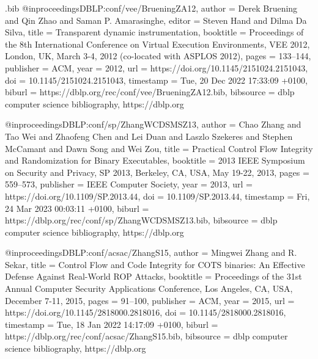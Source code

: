 \begin{filecontents}{\jobname.bib}
@inproceedings{DBLP:conf/vee/BrueningZA12,
  author       = {Derek Bruening and
                  Qin Zhao and
                  Saman P. Amarasinghe},
  editor       = {Steven Hand and
                  Dilma Da Silva},
  title        = {Transparent dynamic instrumentation},
  booktitle    = {Proceedings of the 8th International Conference on Virtual Execution
                  Environments, {VEE} 2012, London, UK, March 3-4, 2012 (co-located
                  with {ASPLOS} 2012)},
  pages        = {133--144},
  publisher    = {{ACM}},
  year         = {2012},
  url          = {https://doi.org/10.1145/2151024.2151043},
  doi          = {10.1145/2151024.2151043},
  timestamp    = {Tue, 20 Dec 2022 17:33:09 +0100},
  biburl       = {https://dblp.org/rec/conf/vee/BrueningZA12.bib},
  bibsource    = {dblp computer science bibliography, https://dblp.org}
}

@inproceedings{DBLP:conf/sp/ZhangWCDSMSZ13,
  author       = {Chao Zhang and
                  Tao Wei and
                  Zhaofeng Chen and
                  Lei Duan and
                  Laszlo Szekeres and
                  Stephen McCamant and
                  Dawn Song and
                  Wei Zou},
  title        = {Practical Control Flow Integrity and Randomization for Binary Executables},
  booktitle    = {2013 {IEEE} Symposium on Security and Privacy, {SP} 2013, Berkeley,
                  CA, USA, May 19-22, 2013},
  pages        = {559--573},
  publisher    = {{IEEE} Computer Society},
  year         = {2013},
  url          = {https://doi.org/10.1109/SP.2013.44},
  doi          = {10.1109/SP.2013.44},
  timestamp    = {Fri, 24 Mar 2023 00:03:11 +0100},
  biburl       = {https://dblp.org/rec/conf/sp/ZhangWCDSMSZ13.bib},
  bibsource    = {dblp computer science bibliography, https://dblp.org}
}

@inproceedings{DBLP:conf/acsac/ZhangS15,
  author       = {Mingwei Zhang and
                  R. Sekar},
  title        = {Control Flow and Code Integrity for {COTS} binaries: An Effective
                  Defense Against Real-World {ROP} Attacks},
  booktitle    = {Proceedings of the 31st Annual Computer Security Applications Conference,
                  Los Angeles, CA, USA, December 7-11, 2015},
  pages        = {91--100},
  publisher    = {{ACM}},
  year         = {2015},
  url          = {https://doi.org/10.1145/2818000.2818016},
  doi          = {10.1145/2818000.2818016},
  timestamp    = {Tue, 18 Jan 2022 14:17:09 +0100},
  biburl       = {https://dblp.org/rec/conf/acsac/ZhangS15.bib},
  bibsource    = {dblp computer science bibliography, https://dblp.org}
}


\end{filecontents}
